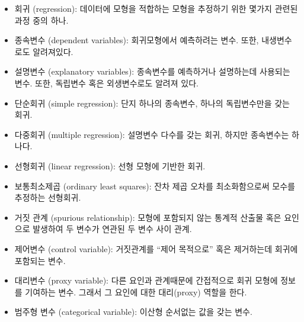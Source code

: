 \begin{itemize}

\item 회귀 (regression): 데이터에 모형을 적합하는 모형을 추정하기 위한 몇가지 관련된 과정 중의 하나.

\item 종속변수 (dependent variables): 회귀모형에서 예측하려는 변수. 또한, 내생변수로도 알려져있다.

\item 설명변수 (explanatory variables): 종속변수를 예측하거나 설명하는데 사용되는 변수. 또한, 독립변수 혹은 외생변수로도 알려져 있다.

\item 단순회귀 (simple regression): 단지 하나의 종속변수, 하나의 독립변수만을 갖는 회귀.

\item 다중회귀 (multiple regression): 설명변수 다수를 갖는 회귀, 하지만 종속변수는 하나다.

\item 선형회귀 (linear regression): 선형 모형에 기반한 회귀.

\item 보통최소제곱 (ordinary least squares): 잔차 제곱 오차를 최소화함으로써 모수를 추정하는 선형회귀.

\item 거짓 관계 (spurious relationship): 
모형에 포함되지 않는 통계적 산출물 혹은 요인으로 발생하여 두 변수가 연관된 두 변수 사이 관계. 

\item 제어변수 (control variable): 거짓관계를 ``제어 목적으로'' 혹은 제거하는데 회귀에 포함되는 변수.

\item 대리변수 (proxy variable): 다른 요인과 관계때문에 간접적으로 회귀 모형에 정보를 기여하는 변수. 그래서 그 요인에 대한 대리(proxy) 역할을 한다.

\item 범주형 변수 (categorical variable): 이산형 순서없는 값을 갖는 변수.


\end{itemize}
